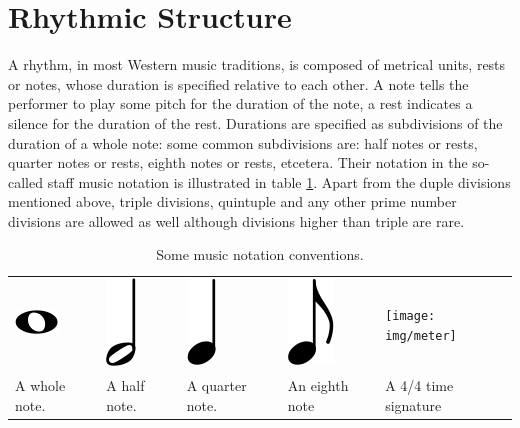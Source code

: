 \section{Rhythmic Structure}
\label{sec:structure}

A rhythm, in most Western music traditions, is composed of metrical units, rests or notes, whose duration is specified relative to each other. A note tells the performer to play some pitch for the duration of the note, a rest indicates a silence for the duration of the rest. Durations are specified as subdivisions of the duration of a whole note: some common subdivisions are: half notes or rests, quarter notes or rests, eighth notes or rests, etcetera. Their notation in the so-called staff music notation is illustrated in table \ref{tab:notation}. Apart from the duple divisions mentioned above, triple divisions, quintuple and any other prime number divisions are allowed as well although divisions higher than triple are rare. 

\begin{table}
\caption{Some music notation conventions.}
\label{tab:notation}
\centering
\begin{tabular}{lllll}
\parbox{0.15\linewidth}{
\centering
\includegraphics[scale=0.5]{img/whole_note}
}
&
\parbox{0.15\linewidth}{
\centering
\includegraphics[scale=0.5]{img/half_note}
}
&
\parbox{0.15\linewidth}{
\centering
\includegraphics[scale=0.5]{img/quarter_note}
}
&
\parbox{0.15\linewidth}{
\centering
\includegraphics[scale=0.5]{img/eighth_note}
}
&
\parbox{0.15\linewidth}{
\centering
\texttt{[image: img/meter]}
}
\\
A whole note. & A half note. & A quarter note. & An eighth note & A 4/4 time signature\\

\end{tabular}
\end{table}

